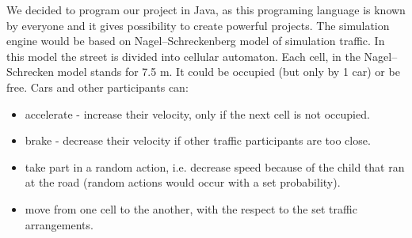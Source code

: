 We decided to program our project in Java, as this programing language is known by everyone and it gives possibility to create powerful projects. The simulation engine would be based on Nagel–Schreckenberg model of simulation traffic. In this model the street is divided into cellular automaton. Each cell, in the Nagel–Schrecken model stands for 7.5 m. It could be occupied (but only by 1 car) or be free. Cars and other participants can:
	\begin{itemize}
		\item accelerate - increase their velocity, only if the next cell is not occupied.
		\item brake - decrease their  velocity if other traffic participants are too close. 
		\item take part in a random action, i.e. decrease speed because of the child that ran at the road (random actions would occur with a set probability). 
		\item move from one cell to the another, with the respect to the set traffic arrangements. 
	\end{itemize}

